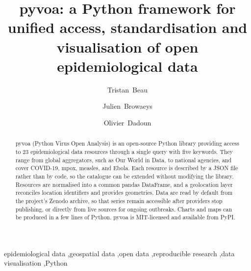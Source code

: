 \documentclass[preprint,12pt,a4paper]{elsarticle}
\begin{document}
\renewcommand{\labelenumii}{\arabic{enumi}.\arabic{enumii}}

\begin{frontmatter}

\title{pyvoa: a Python framework for unified access, standardisation and
visualisation of open epidemiological data}

\author[lpnhe]{Tristan~Beau}
\author[msc]{Julien~Browaeys}
\author[lpnhe]{Olivier~Dadoun}

\address[lpnhe]{Université Paris Cité and Sorbonne Université, CNRS, LPNHE, F-75005 Paris, France}
\address[msc]{Université Paris Cité, CNRS, Matière et systèmes complexes, F-75013 Paris, France}

\begin{abstract}

pyvoa (Python Virus Open Analysis) is an open-source Python library providing
access to 23 epidemiological data resources through a single query with five keywords. They range from global aggregators, such as Our World in Data, to
national agencies, and cover COVID-19, mpox, measles, and Ebola. Each resource
is described by a JSON file rather than by code, so the catalogue can be
extended without modifying the library. Resources are normalised into a common
pandas DataFrame, and a geolocation layer reconciles location identifiers and
provides geometries.  Data are read by default from the project's Zenodo archive, so that series
remain accessible after providers stop publishing, or directly from live
sources for ongoing outbreaks. Charts and maps can be produced in a few lines of Python. pyvoa is MIT-licensed and available from PyPI.

\end{abstract}


\begin{keyword}

epidemiological data  \sep geospatial data \sep open data \sep reproducible research \sep data visualisation  \sep Python 

\end{keyword}

\end{frontmatter}
\end{document}
